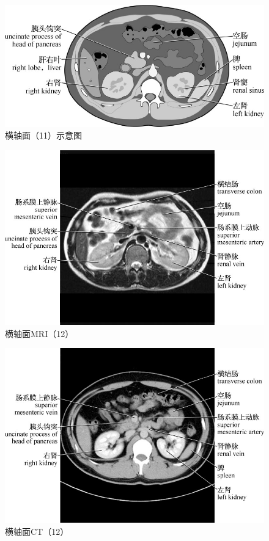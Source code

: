 \begin{figure}[!htbp]
 \centering
 \includegraphics{./images/Image00034.jpg}
 \captionsetup{justification=centering}
 \caption{横轴面（11）示意图}
  \end{figure} 
 \FloatBarrier

\begin{figure}[!htbp]
 \centering
 \includegraphics{./images/Image00035.jpg}
 \captionsetup{justification=centering}
 \caption{横轴面MRI（12）}
  \end{figure} 
 \FloatBarrier

\begin{figure}[!htbp]
 \centering
 \includegraphics{./images/Image00036.jpg}
 \captionsetup{justification=centering}
 \caption{横轴面CT（12）}
  \end{figure} 
 \FloatBarrier

